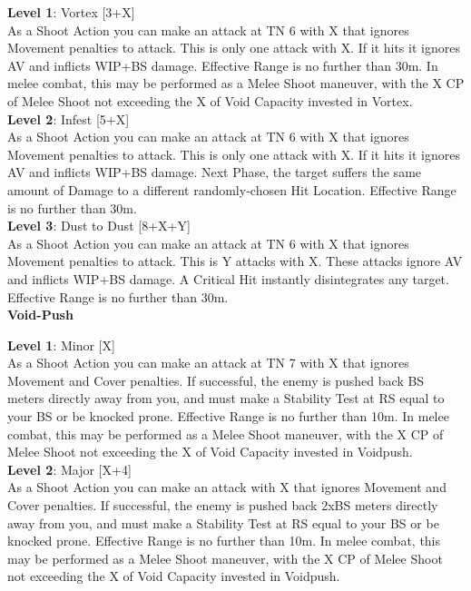 \documentclass[a4paper, twocolumn, openany]{book}
\newlength{\indentlen}
\newcommand{\tabto}[1]{\setlength{\leftskip}{#1\indentlen}}
\begin{document}
{	\tabto{1}
	{\bfseries Level 1}: Vortex [3+X]\\
	As a Shoot Action you can make an attack at TN 6 with X that ignores Movement
	penalties to attack. This is only one attack with X. If it hits it ignores AV and inflicts
	WIP+BS damage. Effective Range is no further than 30m. In melee combat, this may be
	performed as a Melee Shoot maneuver, with the X CP of Melee Shoot not exceeding the
	X of Void Capacity invested in Vortex.\\

		\tabto{2}
		{\bfseries Level 2}: Infest [5+X]\\
		As a Shoot Action you can make an attack at TN 6 with X that ignores Movement
		penalties to attack. This is only one attack with X. If it hits it ignores AV and
		inflicts WIP+BS damage. Next Phase, the target suffers the same amount of
		Damage to a different randomly-chosen Hit Location. Effective Range is no
		further than 30m.\\

			\tabto{3}
			{\bfseries Level 3}: Dust to Dust [8+X+Y]\\
			As a Shoot Action you can make an attack at TN 6 with X that ignores
			Movement penalties to attack. This is Y attacks with X. These attacks
			ignore AV and inflicts WIP+BS damage. A Critical Hit instantly
			disintegrates any target. Effective Range is no further than 30m.\\

\tabto{0}
{\bfseries\large Void-Push\\}

	\tabto{1}
	{\bfseries Level 1}:  Minor [X]\\
	As a Shoot Action you can make an attack at TN 7 with X that ignores Movement and
	Cover penalties. If successful, the enemy is pushed back BS meters directly away from you, and
	must make a Stability Test at RS equal to your BS or be knocked prone. Effective Range is no
	further than 10m. In melee combat, this may be performed as a Melee Shoot maneuver, with
	the X CP of Melee Shoot not exceeding the X of Void Capacity invested in Voidpush.\\

		\tabto{2}
		{\bfseries Level 2}: Major [X+4]\\
		As a Shoot Action you can make an attack with X that ignores Movement and
		Cover penalties. If successful, the enemy is pushed back 2xBS meters directly away
		from you, and must make a Stability Test at RS equal to your BS or be knocked prone.
		Effective Range is no further than 10m. In melee combat, this may be performed as a
		Melee Shoot maneuver, with the X CP of Melee Shoot not exceeding the X of Void
		Capacity invested in Voidpush.\\

}
\end{document}
